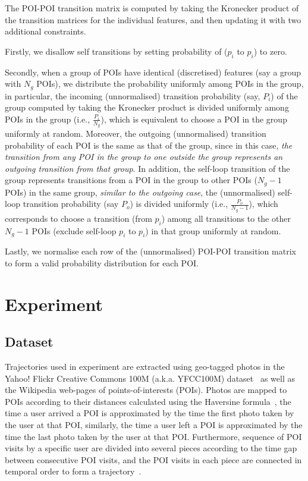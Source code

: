 The POI-POI transition matrix is computed by taking the Kronecker product of the transition matrices for the individual features,
and then updating it with two additional constraints.

Firstly, we disallow self transitions by setting probability of ($p_i$ to $p_i$) to zero.

Secondly, when a group of POIs have identical (discretised) features (say a group with $N_g$ POIs), 
we distribute the probability uniformly among POIs in the group,
in particular, the incoming (unnormalised) transition probability (say, $P_i$) of the group computed by taking the Kronecker product is divided uniformly 
among POIs in the group (i.e., $\frac{P_i}{N_g}$), which is equivalent to choose a POI in the group uniformly at random.
Moreover, the outgoing (unnormalised) transition probability of each POI is the same as that of the group, 
since in this case, \textit{the transition from any POI in the group to one outside the group represents an outgoing transition from that group}.
In addition, the self-loop transition of the group represents transitions from a POI in the group to other POIs ($N_g-1$ POIs) in the same group, 
\textit{similar to the outgoing case}, the (unnormalised) self-loop transition probability (say $P_o$) is divided uniformly (i.e., $\frac{P_o}{N_g-1}$),
which corresponds to choose a transition (from $p_i$) among all transitions to the other $N_g-1$ POIs (exclude self-loop $p_i$ to $p_i$)
in that group uniformly at random.

Lastly, we normalise each row of the (unnormalised) POI-POI transition matrix to form a valid probability distribution for each POI.



\section{Experiment}

\subsection{Dataset}
Trajectories used in experiment are extracted using geo-tagged photos in the Yahoo! Flickr Creative Commons 100M
(a.k.a. YFCC100M) dataset~\cite{thomee2016yfcc100m} as well as the Wikipedia web-pages of points-of-interests (POIs).
Photos are mapped to POIs according to their distances calculated using the Haversine formula~\cite{haversine},
the time a user arrived a POI is approximated by the time the first photo taken by the user at that POI,
similarly, the time a user left a POI is approximated by the time the last photo taken
by the user at that POI.
Furthermore, sequence of POI visits by a specific user are divided into several pieces according to
the time gap between consecutive POI visits, and the POI visits in each piece are connected in temporal order
to form a trajectory~\cite{ht10, ijcai15}.

